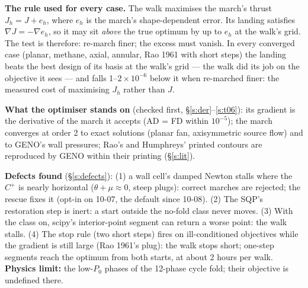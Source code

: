 \textbf{The rule used for every case.} The walk maximises the march's thrust $J_h=J+e_h$, where $e_h$ is the march's
shape-dependent error. Its landing satisfies $\nabla J=-\nabla e_h$, so it may sit \emph{above} the true optimum by up to
$e_h$ at the walk's grid. The test is therefore: re-march finer; the excess must vanish. In every converged case
(planar, methane, axial, annular, Rao 1961 with short steps) the landing beats the best design of its basis at the walk's
grid --- the walk did its job on the objective it sees --- and falls 1--$2\times10^{-6}$ below it when re-marched finer:
the measured cost of maximising $J_h$ rather than $J$.


\textbf{What the optimiser stands on} (checked first, \S\ref{s:der}--\ref{s:t06}): its gradient is the derivative of the
march it accepts (AD = FD within $10^{-5}$); the march converges at order 2 to exact solutions (planar fan, axisymmetric
source flow) and to GENO's wall pressures; Rao's and Humphreys' printed contours are reproduced by GENO within their
printing (\S\ref{s:lit}).

\textbf{Defects found} (\S\ref{s:defects}): (1) a wall cell's damped Newton stalls where the $C^+$ is nearly horizontal
($\theta+\mu\approx0$, steep plugs): correct marches are rejected; the rescue fixes it (opt-in on 10-07, the default since 10-08). (2) The SQP's restoration
step is inert: a start outside the no-fold class never moves. (3) With the class on, scipy's interior-point segment can
return a worse point: the walk stalls. (4) The stop rule (two short steps) fires on ill-conditioned objectives while
the gradient is still large (Rao 1961's plug): the walk stops short; one-step segments reach the optimum from both
starts, at about 2 hours per walk. \textbf{Physics limit:} the low-$P_0$ phases of the 12-phase cycle fold; their objective is undefined there.
